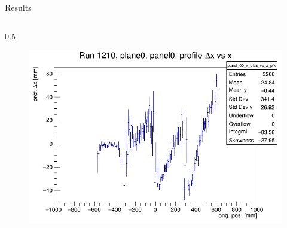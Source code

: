 \documentclass{beamer}[10pt]
\begin{document}
\begin{frame}{Results}
\begin{columns}
\begin{column}{0.5\framewidth}
      \begin{figure}[H]
        \centering
        \includegraphics[width= \textwidth]{figures/pdf/panel_00_x_bias_vs_x_prof.png}
        \label{fig:enter-label}
    \end{figure}
    \end{column}
  \end{columns}
\end{frame}
\end{document}
